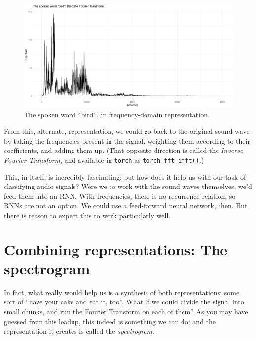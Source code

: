 \documentclass[
  letterpaper,
]{krantz}
\begin{document}
\begin{figure}[H]

{\centering \includegraphics{images/audio-bird-dft.png}

}

\caption{\label{fig-audio-bird-dft}The spoken word ``bird'', in
frequency-domain representation.}

\end{figure}

From this, alternate, representation, we could go back to the original
sound wave by taking the frequencies present in the signal, weighting
them according to their coefficients, and adding them up. (That opposite
direction is called the \emph{Inverse Fourier Transform}, and available
in \texttt{torch} as \texttt{torch\_fft\_ifft()}.)

This, in itself, is incredibly fascinating; but how does it help us with
our task of classifying audio signals? Were we to work with the sound
waves themselves, we'd feed them into an RNN. With frequencies, there is
no recurrence relation; so RNNs are not an option. We could use a
feed-forward neural network, then. But there is reason to expect this to
work particularly well.

\hypertarget{combining-representations-the-spectrogram}{%
\section{Combining representations: The
spectrogram}\label{combining-representations-the-spectrogram}}

In fact, what really would help us is a synthesis of both
representations; some sort of ``have your cake and eat it, too''. What
if we could divide the signal into small chunks, and run the Fourier
Transform on each of them? As you may have guessed from this leadup,
this indeed is something we can do; and the representation it creates is
called the \emph{spectrogram}.
\end{document}
